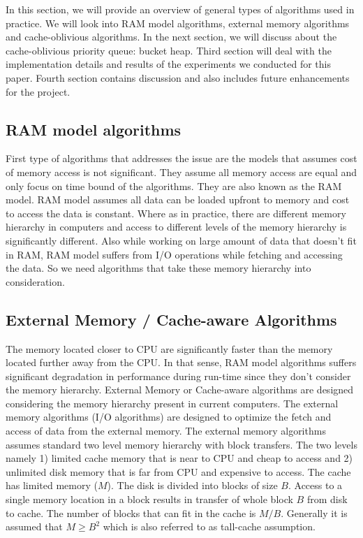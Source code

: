 \documentclass[final,3p]{CSP}
\begin{document}
    In this section, we will provide an overview of general types of algorithms used in practice. We will look into RAM model algorithms, external memory algorithms and cache-oblivious algorithms.  In the next section, we will discuss about the cache-oblivious priority queue: bucket heap. Third section will deal with the implementation details and results of the experiments we conducted for this paper. Fourth section contains discussion and also includes future enhancements for the project.

    \subsection{RAM model algorithms}
    First type of algorithms that addresses the issue are the models that assumes cost of memory access is not significant. They assume all memory access are equal and only focus on time bound of the algorithms. They are also known as the RAM model. RAM model assumes all data can be loaded upfront to memory and cost to access the data is constant. Where as in practice, there are different memory hierarchy in computers and access to different levels of the memory hierarchy is significantly different. Also while working on large amount of data that doesn't fit in RAM, RAM model suffers from I/O operations while fetching and accessing the data. So we need algorithms that take these memory hierarchy into consideration.

    \subsection{External Memory / Cache-aware Algorithms}
    The memory located closer to CPU are significantly faster than the memory located further away from the CPU. In that sense, RAM model algorithms suffers significant degradation in performance during run-time since they don't consider the memory hierarchy. External Memory or Cache-aware algorithms are designed considering the memory hierarchy present in current computers. The external memory algorithms (I/O algorithms) are designed to optimize the fetch and access of data from the external memory. The external memory algorithms assumes standard two level memory hierarchy with block transfers.
    The two levels namely 1) limited cache memory that is near to CPU and cheap to access and 2) unlimited disk memory that is far from CPU and expensive to access. The cache has limited memory ($M$). The disk is divided into blocks of size $B$. Access to a single memory location in a block results in transfer of whole block $B$ from disk to cache. The number of blocks that can fit in the cache is $M/B$. Generally it is assumed that $M \geq B^2$ which is also referred to as tall-cache assumption.
\end{document}
